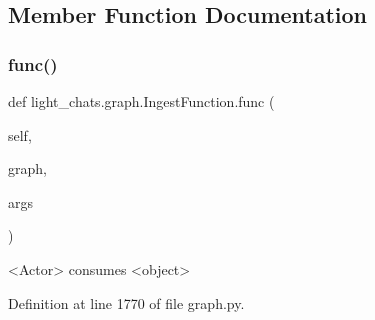 \subsection{Member Function Documentation}
\mbox{\label{classlight__chats_1_1graph_1_1IngestFunction_acf3afc20e4e55a9bd2783d2bad592a88}} 
\subsubsection{\texorpdfstring{func()}{func()}}
{\footnotesize\ttfamily def light\+\_\+chats.\+graph.\+Ingest\+Function.\+func (\begin{DoxyParamCaption}\item[{}]{self,  }\item[{}]{graph,  }\item[{}]{args }\end{DoxyParamCaption})}

\begin{DoxyVerb}<Actor> consumes <object>
\end{DoxyVerb}
 

Definition at line 1770 of file graph.\+py.


